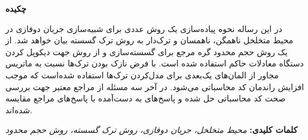 \thispagestyle{empty}
\noindent
\centerline{\textbf{\large چکیده }} 
\vskip 1cm

\noindent
در این رساله نحوه پیاده‌سازی یک روش عددی برای شبیه‌سازی جریان دوفازی در محیط متخلخل ناهمگن، ناهمسان و ترک‌دار به روش ترک گسسته بیان خواهد شد. از یک روش حجم محدود گره مرجع برای گسسته‌سازی و از روش  جهت دیکوپل کردن دستگاه معادلات حاکم استفاده شده‌ است.
با فرض نازک بودن ترک‌ها نسبت به ماتریس مجاور از المان‌های یک‌بعدی برای مدل‌کردن ترک‌ها استفاده شده‌است که موجب افزایش راندمان کد محاسباتی می‌شود. در آخر سه مسئله از مراجع معتبر جهت بررسی صحت کد محاسباتی حل شده و پاسخ‌های به دست‌آمده با پاسخ‌های مراجع مقایسه شده‌اند.


\textbf{کلمات کلیدی:} 
\emph{محیط متخلخل، جریان دوفازی، روش ترک گسسته، روش حجم محدود}
